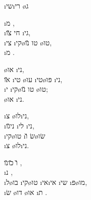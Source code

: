 \textheader%
{ \i{שי}\i{רי}}
{ \o{ג}}
{}
{}
{}
{}
{}




\begin{twocol}
\begin{stanza}
  \i{מ} ,\\
\i{חי}  \u{צו} \i{גי},\\
\i{צי} \i{קי}\o{טו} \u{נו} \o{טו},\\
  \i{מ} .
\end{stanza}

\begin{stanza}
\o{או}  \i{ני},\\
\u{או} \i{טי} \o{עו} \i{טי}\o{פּו} \i{ני},\\
\i{י} \i{קי}\o{טו} \u{נו} \o{טו};\\
 \o{או}  \i{ני}.
\end{stanza}

\begin{stanza}
  \i{צ} \o{לו}\i{ני},\\
 \i{ני}\u{גו} \i{לי}  \i{ני},\\
 \i{קי}\o{טו} \i{שׂ} \u{ו}\o{שׂו}\\
  \i{צ} \o{לו}\i{ני}.
\end{stanza}

\begin{stanza}
\u{ו}  \u{כו}\u{נו}  ,\\
\i{נ}    ,\\
\i{ל}\o{בו} \i{קי}\o{טו} \i{אי}\i{אי} \i{שי}  \i{פּ}\o{מו},\\
\i{שׂ} \o{דו} \o{או} \i{ת} .
\end{stanza}
\end{twocol}



